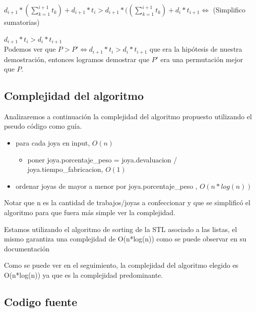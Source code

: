 $d_{i+1}*(\sum\limits_{k=1}^{i+1} t_k) + d_{i+1}*t_i > d_{i+1}*((\sum\limits_{k=1}^{i+1} t_k) + d_i*t_{i+1} \Longleftrightarrow$ (Simplifico sumatorias)

$d_{i+1}*t_i > d_i*t_{i+1}$ \\

Podemos ver que $P > P' \Longleftrightarrow d_{i+1}*t_i > d_i*t_{i+1}$ que era la hip\'otesis de nuestra demostraci\'on, entonces logramos demostrar que $P'$ era una permutaci\'on mejor que $P$.

\subsection{Complejidad del algoritmo}

Analizaremos a continuaci\'on la complejidad del algoritmo propuesto utilizando el pseudo c\'odigo como gu\'ia.

\begin{itemize}
\item para cada  joya en input, $O(n)$
\begin{itemize}
\item poner joya.porcentaje\_peso = joya.devaluacion / joya.tiempo\_fabricacion, $O(1)$
\end{itemize}

\item ordenar joyas de mayor a menor por joya.porcentaje\_peso , $O(n*log(n))$
\end{itemize}

Notar que n es la cantidad de trabajos/joyas a confeccionar y que se simplific\'o el algoritmo para que fuera m\'as simple ver la complejidad.

Estamos utilizando el algoritmo de sorting de la STL asociado a las listas, el mismo garantiza una complejidad de O(n*log(n)) como se puede observar en su documentaci\'on \cite{sort}

Como se puede ver en el seguimiento, la complejidad del algoritmo elegido es O(n*log(n)) ya que es la complejidad predominante.\\

\newpage
\subsection{Codigo fuente}

